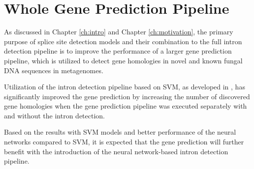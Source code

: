 \section{\label{ch:evaluation:whole}Whole Gene Prediction Pipeline}

As discussed in Chapter \ref{ch:intro} and Chapter \ref{ch:motivation}, the
primary purpose of splice site detection models and their combination to the
full intron detection pipeline is to improve the performance of a larger gene
prediction pipeline, which is utilized to detect gene homologies in novel and
known fungal DNA sequences in metagenomes.

Utilization of the intron detection pipeline based on SVM, as developed in
\cite{barucic}, has significantly improved the gene prediction by increasing
the number of discovered gene homologies when the gene prediction pipeline was
executed separately with and without the intron detection.

Based on the results with SVM models and better performance of the neural
networks compared to SVM, it is expected that the gene prediction will further
benefit with the introduction of the neural network-based intron detection
pipeline.
